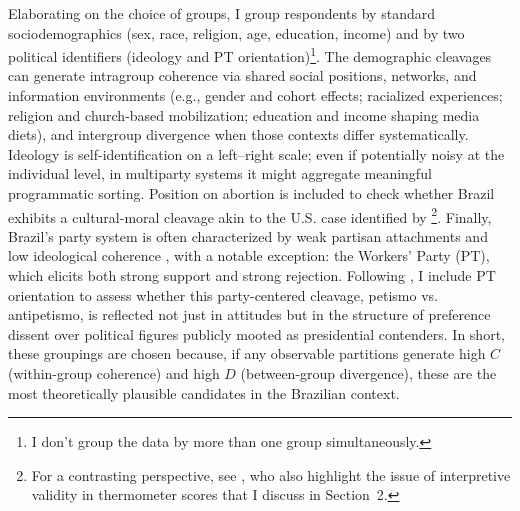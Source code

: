 \documentclass[12pt]{article}
\begin{document}
Elaborating on the choice of groups, I group respondents by standard socio\-demographics (sex, race, religion, age, education, income) and by two political identifiers (ideology and PT orientation)\footnote{I don't group the data by more than one group simultaneously.}. The demographic cleavages can generate {intragroup coherence} via shared social positions, networks, and information environments (e.g., gender and cohort effects; racialized experiences; religion and church-based mobilization; education and income shaping media diets), and {intergroup divergence} when those contexts differ systematically. Ideology is self-identification on a left–right scale; even if potentially noisy at the individual level, in multiparty systems it might aggregate meaningful programmatic sorting. Position on abortion is included to check whether Brazil exhibits a cultural-moral cleavage akin to the U.S. case identified by \textcite{dimaggio1996have}\footnote{For a contrasting perspective, see \textcite{mouw2001culture}, who also highlight the issue of interpretive validity in thermometer scores that I discuss in Section~2.}. Finally, Brazil’s party system is often characterized by weak partisan attachments and low ideological coherence \parencite{borba24_polar_ideol}, with a notable exception: the Workers’ Party (PT), which elicits both strong support and strong rejection. Following \textcite{samuels2018partisans}, I include PT orientation to assess whether this party-centered cleavage, petismo vs. antipetismo, is reflected not just in attitudes but in the {structure} of preference dissent over political figures publicly mooted as presidential contenders. In short, these groupings are chosen because, if any observable partitions generate high \(C\) (within-group coherence) and high \(D\) (between-group divergence), these are the most theoretically plausible candidates in the Brazilian context.





\end{document}
